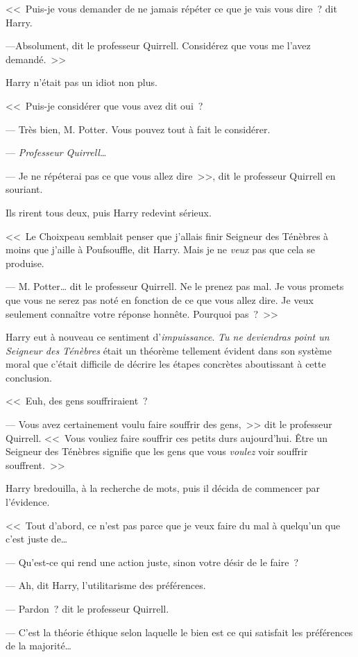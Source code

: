 <<~Puis-je vous demander de ne jamais répéter ce que je vais vous dire~? dit Harry.

---Absolument, dit le professeur Quirrell. Considérez que vous me l'avez demandé.~>>

Harry n'était pas un idiot non plus.

<<~Puis-je considérer que vous avez dit oui~?

--- Très bien, M. Potter. Vous pouvez tout à fait le considérer.

--- \emph{Professeur Quirrell}…

--- Je ne répéterai pas ce que vous allez dire~>>, dit le professeur Quirrell en souriant.

Ils rirent tous deux, puis Harry redevint sérieux.

<<~Le Choixpeau semblait penser que j'allais finir Seigneur des Ténèbres à moins que j'aille à Poufsouffle, dit Harry. Mais je ne \emph{veux} pas que cela se produise.

--- M. Potter… dit le professeur Quirrell. Ne le prenez pas mal. Je vous promets que vous ne serez pas noté en fonction de ce que vous allez dire. Je veux seulement connaître votre réponse honnête. Pourquoi pas~?~>>

Harry eut à nouveau ce sentiment d'\emph{impuissance}. \emph{Tu ne deviendras point un Seigneur des Ténèbres} était un théorème tellement évident dans son système moral que c'était difficile de décrire les étapes concrètes aboutissant à cette conclusion.

<<~Euh, des gens souffriraient~?

--- Vous avez certainement voulu faire souffrir des gens,~>> dit le professeur Quirrell. <<~Vous vouliez faire souffrir ces petits durs aujourd'hui. Être un Seigneur des Ténèbres signifie que les gens que vous \emph{voulez} voir souffrir souffrent.~>>

Harry bredouilla, à la recherche de mots, puis il décida de commencer par l'évidence.

<<~Tout d'abord, ce n'est pas parce que je veux faire du mal à quelqu'un que c'est juste de…

--- Qu'est-ce qui rend une action juste, sinon votre désir de le faire~?

--- Ah, dit Harry, l'utilitarisme des préférences.

--- Pardon~? dit le professeur Quirrell.

--- C'est la théorie éthique selon laquelle le bien est ce qui satisfait les préférences de la majorité…


